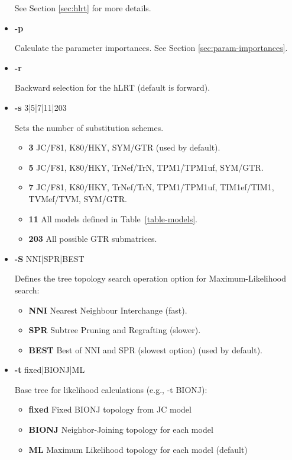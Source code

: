 \begin{itemize}
See Section \ref{sec:hlrt} for more details.

\item  {\bf -p}

Calculate the parameter importances. See Section \ref{sec:param-importances}.

\item  {\bf -r}

Backward selection for the hLRT (default is forward).

\item  {\bf -s} 3|5|7|11|203

Sets the number of substitution schemes.
\begin{itemize}
     \item {\bf 3} JC/F81, K80/HKY, SYM/GTR (used by default).
     \item {\bf 5} JC/F81, K80/HKY, TrNef/TrN, TPM1/TPM1uf, SYM/GTR.
     \item {\bf 7} JC/F81, K80/HKY, TrNef/TrN, TPM1/TPM1uf, TIM1ef/TIM1, TVMef/TVM, SYM/GTR.
     \item {\bf 11} All models defined in Table~\ref{table-models}.
     \item {\bf 203} All possible GTR submatrices.
\end{itemize}

\item  {\bf -S} NNI|SPR|BEST

Defines the tree topology search operation option for Maximum-Likelihood search: 
\begin{itemize}
     \item {\bf NNI} Nearest Neighbour Interchange (fast).
     \item {\bf SPR} Subtree Pruning and Regrafting (slower).
     \item {\bf BEST} Best of NNI and SPR (slowest option) (used by default).
\end{itemize}

\item  {\bf -t} fixed|BIONJ|ML

Base tree for likelihood calculations (e.g., -t BIONJ):
\begin{itemize}
     \item {\bf fixed}  Fixed BIONJ topology from JC model
     \item {\bf BIONJ}  Neighbor-Joining topology for each model
     \item {\bf ML}     Maximum Likelihood topology for each model (default)
\end{itemize}


\end{itemize}

